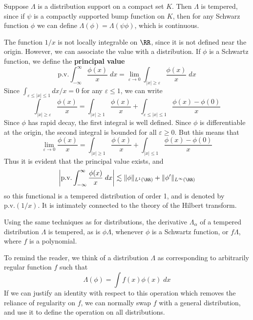 \begin{example}
    Suppose $\Lambda$ is a distribution support on a compact set $K$. Then $\Lambda$ is tempered, since if $\psi$ is a compactly supported bump function on $K$, then for any Schwarz function $\phi$ we can define $\Lambda(\phi) = \Lambda(\psi \phi)$, which is continuous.
\end{example}

\begin{example}
    The function $1/x$ is not locally integrable on $\RR$, since it is not defined near the origin. However, we can associate the value with a distribution. If $\phi$ is a Schwartz function, we define the {\bf principal value}
    \[ \text{p.v.} \int_{-\infty}^\infty \frac{\phi(x)}{x}\; dx = \lim_{\varepsilon \to 0} \int_{|x| \geq \varepsilon} \frac{\phi(x)}{x}\; dx \]
    Since $\int_{\varepsilon \leq |x| \leq 1} dx/x = 0$ for any $\varepsilon \leq 1$, we can write
    \[ \int_{|x| \geq \varepsilon} \frac{\phi(x)}{x} = \int_{|x| \geq 1} \frac{\phi(x)}{x} + \int_{\varepsilon \leq |x| \leq 1} \frac{\phi(x) - \phi(0)}{x} \]
    Since $\phi$ has rapid decay, the first integral is well defined. Since $\phi$ is differentiable at the origin, the second integral is bounded for all $\varepsilon \geq 0$. But this means that
    \[ \lim_{\varepsilon \to 0} \frac{\phi(x)}{x} = \int_{|x| \geq 1} \frac{\phi(x)}{x} + \int_{|x| \leq 1} \frac{\phi(x) - \phi(0)}{x} \]
    Thus it is evident that the principal value exists, and
    \[ \left| \text{p.v.} \int_{-\infty}^\infty \frac{\phi(x)}{x}\; dx \right| \lesssim \| \phi \|_{L^1(\RR)} + \| \phi' \|_{L^\infty(\RR)} \]
    so this functional is a tempered distribution of order 1, and is denoted by $\text{p.v.}(1/x)$. It is intimately connected to the theory of the Hilbert transform. 
\end{example}

Using the same techniques as for distributions, the derivative $\Lambda_\alpha$ of a tempered distribution $\Lambda$ is tempered, as is $\phi \Lambda$, whenever $\phi$ is a Schwartz function, or $f \Lambda$, where $f$ is a polynomial.

To remind the reader, we think of a distribution $\Lambda$ as corresponding to arbitrarily regular function $f$ such that
%
\[ \Lambda(\phi) = \int f(x) \phi(x)\; dx \]
%
If we can justify an identity with respect to this operation which removes the reliance of regularity on $f$, we can normally swap $f$ with a general distribution, and use it to define the operation on all distributions.

